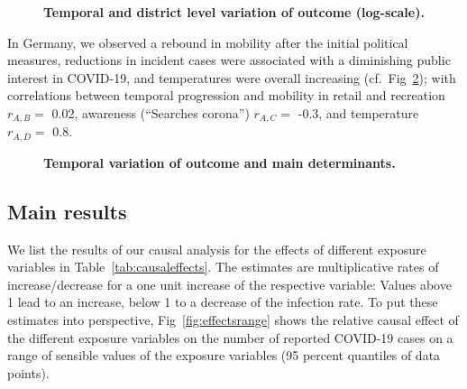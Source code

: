 \documentclass[10pt,letterpaper]{article}
\begin{document}
\begin{figure}[!h]
\caption{{\bf Temporal and district level variation of outcome (log-scale).}}
\label{fig:cases-log}
\end{figure}

In Germany, we observed a rebound in mobility after the initial political measures, reductions in incident cases were associated with a diminishing public interest in COVID-19, and temperatures were overall increasing (cf.~Fig~\ref{fig:timeseries}); with correlations between temporal progression and mobility in retail and recreation \(r_{A,B}=\) 0.02, awareness (``Searches corona'') \(r_{A,C}=\) -0.3, and temperature \(r_{A,D}=\) 0.8.

\begin{figure}[!h]
\caption{{\bf Temporal variation of outcome and main
determinants.}}
\label{fig:timeseries}
\end{figure}

\subsection*{Main results}\label{main-results}

We list the results of our causal analysis for the effects of different exposure variables in Table~\ref{tab:causaleffects}. The estimates are multiplicative rates of increase/decrease for a one unit increase of the respective variable: Values above 1 lead to an increase, below 1 to a decrease of the infection rate. To put these estimates into perspective, Fig~\ref{fig:effectsrange} shows the relative causal effect of the different exposure variables on the number of reported COVID-19 cases on a range of sensible values of the exposure variables (95 percent quantiles of data points).
\end{document}
